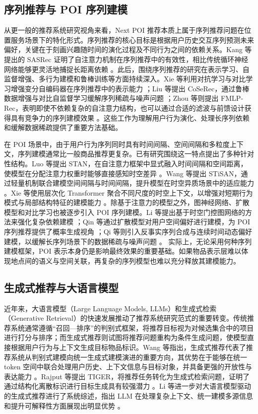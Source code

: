 \subsection{序列推荐与 POI 序列建模}

从更一般的推荐系统研究视角来看，Next POI 推荐本质上属于序列推荐问题在位置服务场景下的特化形式。序列推荐的核心目标是根据用户历史交互序列预测未来偏好，关键在于刻画兴趣随时间的演化过程及不同行为之间的依赖关系。Kang 等提出的 SASRec 证明了自注意力机制在序列推荐中的有效性，相比传统循环神经网络能够更灵活地捕捉长距离依赖 \cite{kang2018sasrec}。此后，围绕序列推荐的研究在表示学习、自监督增强、多行为建模和鲁棒训练等方面持续深入。Xie 等利用对抗学习与对比学习增强变分自编码器在序列推荐中的表示能力 \cite{xie2021acvae}；Liu 等提出 CoSeRec，通过鲁棒数据增强与对比自监督学习缓解序列稀疏与噪声问题 \cite{liu2021coserec}；Zhou 等则提出 FMLP-Rec，表明即使不依赖复杂的自注意力结构，也可以通过合适的滤波与前馈设计获得具有竞争力的序列建模效果 \cite{zhou2022fmlprec}。这些工作为理解用户行为演化、处理长序列依赖和缓解数据稀疏提供了重要方法基础。

在 POI 场景中，由于用户行为序列同时具有时间间隔、空间间隔和多粒度上下文，序列建模通常比一般商品推荐更复杂。已有研究围绕这一特点提出了多种针对性结构。Luo 等提出 STAN，在自注意力框架中显式融入时间间隔和空间距离，使模型在分配注意力权重时能够直接感知时空差异 \cite{luo2021stan}。Wang 等提出 STiSAN，通过轻量机制联合建模空间间隔与时间间隔，提升模型在时空异质场景中的适应能力 \cite{wang2022stisan}。Xie 等使用层次化 Transformer 聚合不同尺度的时空上下文，以增强对短期行为模式与局部结构特征的建模能力 \cite{xie2022htstca}。除基于注意力的模型之外，图神经网络、扩散模型和对比学习也被逐步引入 POI 序列建模。Li 等提出基于时空门控图网络的方法来强化复杂依赖建模 \cite{li2022atstggnn}；Qin 等通过扩散模型对用户空间偏好进行建模，为 POI 序列推荐提供了概率生成视角 \cite{qin2023diffpoi}；Qi 等则引入反事实序列合成与连续时间动态偏好建模，以缓解长序列场景下的数据稀疏与噪声问题 \cite{qi2024counterfactualpoi}。
实际上，无论采用何种序列建模框架，POI 表示本身仍是影响最终效果的重要基础。如果物品表示层难以体现地点间的语义与空间关联，再复杂的序列模型也难以充分释放其建模能力。

\subsection{生成式推荐与大语言模型}

近年来，大语言模型（Large Language Models, LLMs）和生成式检索（Generative Retrieval）的快速发展推动了推荐系统研究范式的重要转变。传统推荐系统通常遵循“召回—排序”的判别式框架，将推荐目标视为对候选集合中的项目进行打分与排序；而生成式推荐则试图将推荐问题重构为条件生成问题，使模型直接根据用户行为与上下文生成目标物品标识。Wang 等指出，生成式推荐代表了推荐系统从判别式建模向统一生成式建模演进的重要方向，其优势在于能够在统一 token 空间中联合处理用户历史、上下文信息与目标对象，并具备更强的开放性与表达能力 \cite{wang2023genrecsurvey}。Rajput 等提出 TIGER，将推荐任务转化为生成式检索问题，证明了通过结构化离散标识进行目标生成具有较强潜力 \cite{rajput2023tiger}。Li 等进一步对大语言模型驱动的生成式推荐进行了系统综述，指出 LLM 在处理复杂上下文、统一建模多源信息和提升可解释性方面展现出明显优势 \cite{li2023llmgenrecsurvey}。


